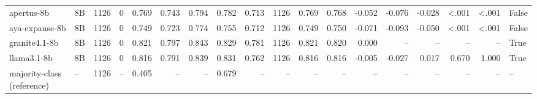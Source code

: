 \begin{table}[t]
\begin{tabular}{llrrrrrrrrrrrrrrrl}
apertus-8b & 8B & 1126 & 0 & 0.769 & 0.743 & 0.794 & 0.782 & 0.713 & 1126 & 0.769 & 0.768 & -0.052 & -0.076 & -0.028 & <.001 & <.001 & False \\
aya-expanse-8b & 8B & 1126 & 0 & 0.749 & 0.723 & 0.774 & 0.755 & 0.712 & 1126 & 0.749 & 0.750 & -0.071 & -0.093 & -0.050 & <.001 & <.001 & False \\
granite4.1-8b & 8B & 1126 & 0 & 0.821 & 0.797 & 0.843 & 0.829 & 0.781 & 1126 & 0.821 & 0.820 & 0.000 & -- & -- & -- & -- & True \\
llama3.1-8b & 8B & 1126 & 0 & 0.816 & 0.791 & 0.839 & 0.831 & 0.762 & 1126 & 0.816 & 0.816 & -0.005 & -0.027 & 0.017 & 0.670 & 1.000 & True \\
majority-class (reference) & -- & 1126 & -- & 0.405 & -- & -- & 0.679 & -- & -- & -- & -- & -- & -- & -- & -- & -- & -- \\
\bottomrule
\end{tabular}
\end{table}
